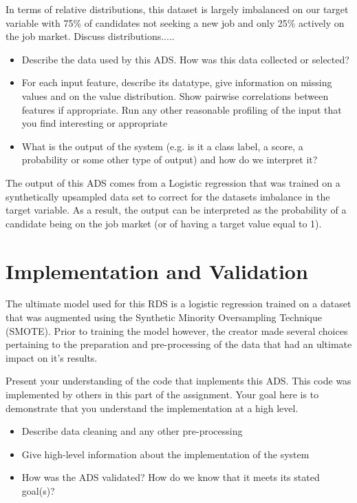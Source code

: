 \documentclass[11pt]{article}
\begin{document}
In terms of relative distributions, this dataset is largely imbalanced on our target variable with 75\% of candidates not seeking a new job and only 25\% actively on the job market.  Discuss distributions.....



\begin{itemize}
	\item Describe the data used by this ADS.  How was this data collected or selected?
	\item For each input feature, describe its datatype, give information on missing values and on the value distribution. Show pairwise correlations between features if appropriate.  Run any other reasonable profiling of the input that you find interesting or appropriate
	\item What is the output of the system (e.g. is it a class label, a score, a probability or some other type of output) and how do we interpret it?
\end{itemize}



The output of this ADS comes from a Logistic regression that was trained on a synthetically upsampled data set to correct for the datasets imbalance in the target variable.  As a result, the output can be interpreted as the probability of a candidate being on the job market (or of having a target value equal to 1).



\pagebreak

\section{Implementation and Validation}

The ultimate model used for this RDS is a logistic regression trained on a dataset that was augmented using the Synthetic Minority Oversampling Technique (SMOTE).  Prior to training the model however, the creator made several choices pertaining to the preparation and pre-processing of the data that had an ultimate impact on it's results.



Present your understanding of the code that implements this ADS.  This code was implemented by others in this part of the assignment.  Your goal here is to demonstrate that you understand the implementation at a high level.
\begin{itemize}
\item Describe data cleaning and any other pre-processing
\item Give high-level information about the implementation of the system
\item How was the ADS validated?  How do we know that it meets its stated goal(s)?
\end{itemize}
\end{document}

